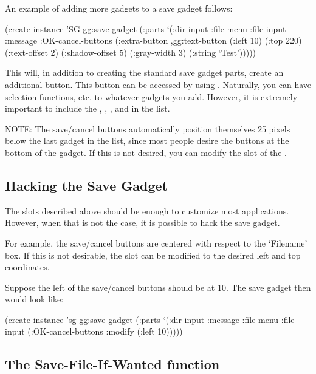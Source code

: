 An example of adding more gadgets to a save gadget follows:
\begin{programexample}
(create-instance 'SG gg:save-gadget
  (:parts
   `(:dir-input :file-menu :file-input :message :OK-cancel-buttons
     (:extra-button ,gg:text-button
      (:left 10) (:top 220)
      (:text-offset 2) (:shadow-offset 5) (:gray-width 3)
      (:string `Test')))))
\end{programexample}

This will, in addition to creating the standard save gadget parts, create
an additional button.  This button can be accessed by using .  Naturally, you can have selection functions, etc. to
whatever gadgets you add.  However, it is extremely important to include
the , , ,  and
 in the  list.

NOTE: The save/cancel buttons automatically position themselves 25
pixels below the last gadget in the  list, since most people
desire the buttons at the bottom of the gadget.  If this is not
desired, you can modify the  slot of the .


\subsection{Hacking the Save Gadget}

The slots described above should be enough to customize most
applications.  However, when that is not the case, it is possible to
hack the save gadget.

For example, the save/cancel buttons are centered with respect to the
`Filename' box.  If this is not desirable, the 
slot can be modified to the desired left and top coordinates.

Suppose the left of the save/cancel buttons should be at 10.  The save
gadget then would look like:
\begin{programexample}
(create-instance 'sg gg:save-gadget	
  (:parts
    `(:dir-input
      :message
      :file-menu
      :file-input
      (:OK-cancel-buttons :modify (:left 10)))))
\end{programexample}



\subsection{The Save-File-If-Wanted function}
\label{save-file-if-wanted-fn}

